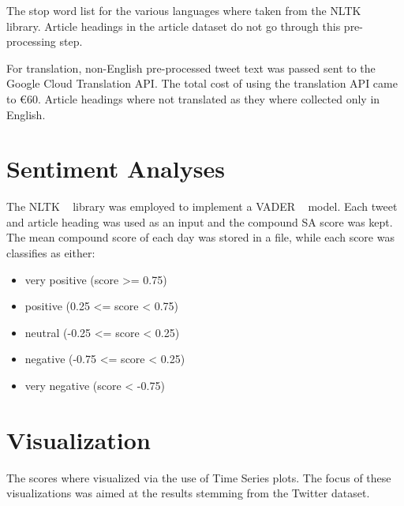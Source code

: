 \noindent The stop word list for the various languages where taken from the \ac{NLTK} ~\citep{bird2009natural} library.
Article headings in the article dataset do not go through this pre-processing step.

For translation, non-English pre-processed tweet text was passed sent to the Google Cloud Translation \ac{API}.
The total cost of using the translation \ac{API} came to €60.
Article headings where not translated as they where collected only in English.

\section{Sentiment Analyses}

The \ac{NLTK} ~\citep{bird2009natural} library was employed to implement a \ac{VADER} ~\citep{Hutto_Gilbert_2014} model.
Each tweet and article heading was used as an input and the compound \ac{SA} score was kept.
The mean compound score of each day was stored in a file, while each score was classifies as either:

\begin{itemize}
    \item very positive (score >= 0.75)
    \item positive (0.25 <= score < 0.75)
    \item neutral (-0.25 <= score < 0.25)
    \item negative (-0.75 <= score < 0.25)
    \item very negative (score < -0.75)
\end{itemize}

\section{Visualization}

The  scores where visualized via the use of Time Series plots.
The focus of these visualizations was aimed at the results stemming from the Twitter dataset.
